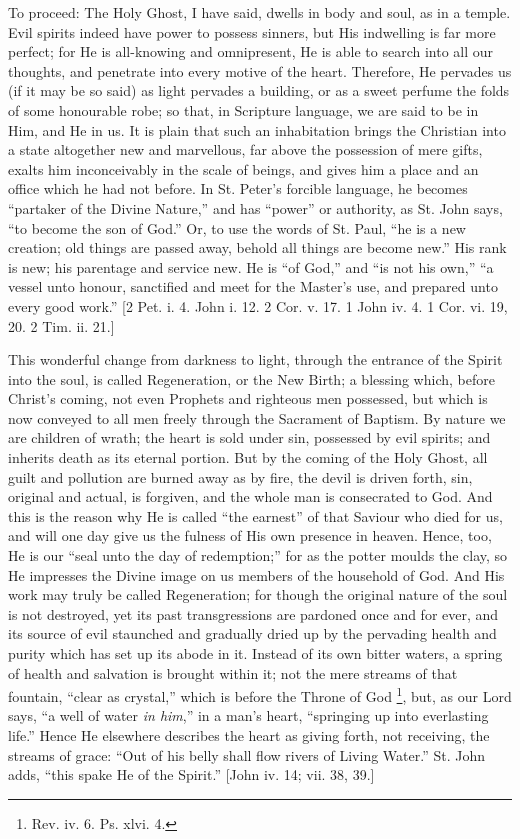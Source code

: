 To proceed: The Holy Ghost, I have said, dwells in body and soul, as
in a temple. Evil spirits indeed have power to possess sinners, but His
indwelling is far more perfect; for He is all-knowing and omnipresent,
He is able to search into all our thoughts, and penetrate into every
motive of the heart. Therefore, He pervades us (if it may be so said) as
light pervades a building, or as a sweet perfume the folds of some
honourable robe; so that, in Scripture language, we are said to be in
Him, and He in us. It is plain that such an inhabitation brings the
Christian into a state altogether new and marvellous, far above the
possession of mere gifts, exalts him inconceivably in the scale of
beings, and gives him a place and an office which he had not before. In
St. Peter's forcible language, he becomes ``partaker of the Divine
Nature,'' and has ``power'' or authority, as St. John says,
``to become the son of God.'' Or, to use the words of St. Paul,
``he is a new creation; old things are passed away, behold all
things are become new.'' His rank is new; his parentage and service
new. He is ``of God,'' and ``is not his own,'' ``a
vessel unto honour, sanctified and meet for the Master's use, and
prepared unto every good work.'' [2 Pet. i. 4. John i. 12. 2 Cor. v.
17. 1 John iv. 4. 1 Cor. vi. 19, 20. 2 Tim. ii. 21.]

This wonderful change from darkness to light, through the entrance of
the Spirit into the soul, is called Regeneration, or the New Birth; a
blessing which, before Christ's coming, not even Prophets and righteous
men possessed, but which is now conveyed to all men freely through the
Sacrament of Baptism. By nature we are children of wrath; the heart is
sold under sin, possessed by evil spirits; and inherits death as its
eternal portion. But by the coming of the Holy Ghost, all guilt and
pollution are burned away as by fire, the devil is driven forth, sin,
original and actual, is forgiven, and the whole man is consecrated to
God. And this is the reason why He is called ``the earnest'' of
that Saviour who died for us, and will one day give us the fulness of
His own presence in heaven. Hence, too, He is our ``seal unto the
day of redemption;'' for as the potter moulds the clay, so He
impresses the Divine image on us members of the household of God. And
His work may truly be called Regeneration; for though the original
nature of the soul is not destroyed, yet its past transgressions are
pardoned once and for ever, and its source of evil staunched and
gradually dried up by the pervading health and purity which has set up
its abode in it. Instead of its own bitter waters, a spring of health
and salvation is brought within it; not the mere streams of that
fountain, ``clear as crystal,'' which is before the Throne of
God \footnote{Rev. iv. 6. Ps. xlvi. 4.}, but, as our Lord says,
``a well of water \emph{in him},'' in a man's heart,
``springing up into everlasting life.'' Hence He elsewhere
describes the heart as giving forth, not receiving, the streams of
grace: ``Out of his belly shall flow rivers of Living Water.''
St. John adds, ``this spake He of the Spirit.'' [John iv. 14;
vii. 38, 39.]

